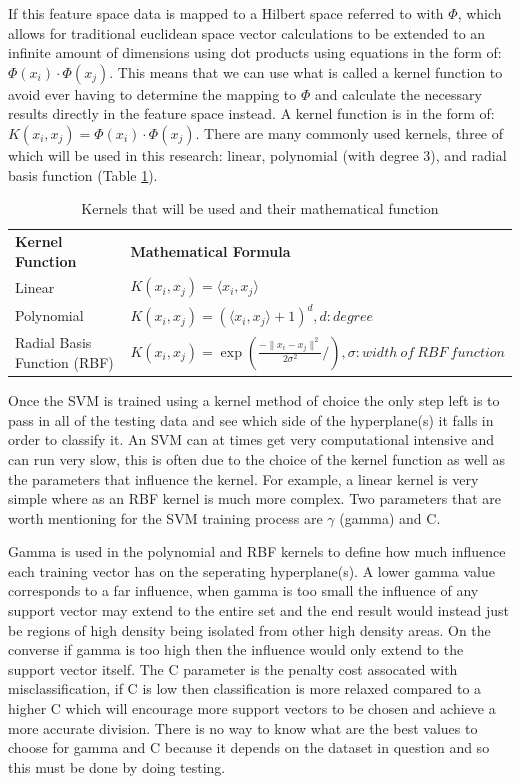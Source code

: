 If this feature space data is mapped to a Hilbert space referred to with $\Phi$, which allows for traditional euclidean space vector calculations to be extended to an infinite amount of dimensions using dot products using equations in the form of: $\Phi\left(x_i \right)\cdot\Phi\left(x_j \right)$.  This means that we can use what is called a kernel function to avoid ever having to determine the mapping to $\Phi$ and calculate the necessary results directly in the feature space instead.  A kernel function is in the form of: $K(x_{i},x_{j}) = \Phi(x_i) \cdot \Phi(x_j)$. \cite{supervisedMachineLearning}  There are many commonly used kernels, three of which will be used in this research: linear, polynomial (with degree 3), and radial basis function (Table \ref{tab:kernels}).  

\begin{table}[h]
	\centering
	\begin{tabular}{|p{1.5in}|p{4.5in}|}
	\hline
		\textbf{Kernel Function} & \textbf{Mathematical Formula}\\
	\hhline{|=|=|}
		Linear  & $K(x_{i},x_{j}) = \langle x_{i},x_{j}\rangle$ \\
	\hline
		Polynomial & $K(x_{i},x_{j}) = (\langle x_{i},x_{j}\rangle + 1)^d, d: degree$ \\
	\hline
		Radial Basis Function (RBF) & $K(x_{i},x_{j}) = \exp\left(\frac{- \parallel x_i - x_j \parallel^2}{2\sigma^2} /\right), \sigma : width\ of\ RBF\ function$ \\
	\hline
	\end{tabular}
	\caption{Kernels that will be used and their mathematical function} \cite{intrusionDetectionCostBased}
	\label{tab:kernels}
\end{table}

Once the SVM is trained using a kernel method of choice the only step left is to pass in all of the testing data and see which side of the hyperplane(s) it falls in order to classify it.  An SVM can at times get very computational intensive and can run very slow, this is often due to the choice of the kernel function as well as the parameters that influence the kernel.  For example, a linear kernel is very simple where as an RBF kernel is much more complex.  Two parameters that are worth mentioning for the SVM training process are $\gamma$ (gamma) and C.

Gamma is used in the polynomial and RBF kernels to define how much influence each training vector has on the seperating hyperplane(s).  A lower gamma value corresponds to a far influence, when gamma is too small the influence of any support vector may extend to the entire set and the end result would instead just be regions of high density being isolated from other high density areas.  On the converse if gamma is too high then the influence would only extend to the support vector itself.  The C parameter is the penalty cost assocated with misclassification, if C is low then classification is more relaxed compared to a higher C which will encourage more support vectors to be chosen and achieve a more accurate division. \cite{rbfSVMParameters}  There is no way to know what are the best values to choose for gamma and C because it depends on the dataset in question and so this must be done by doing testing.

